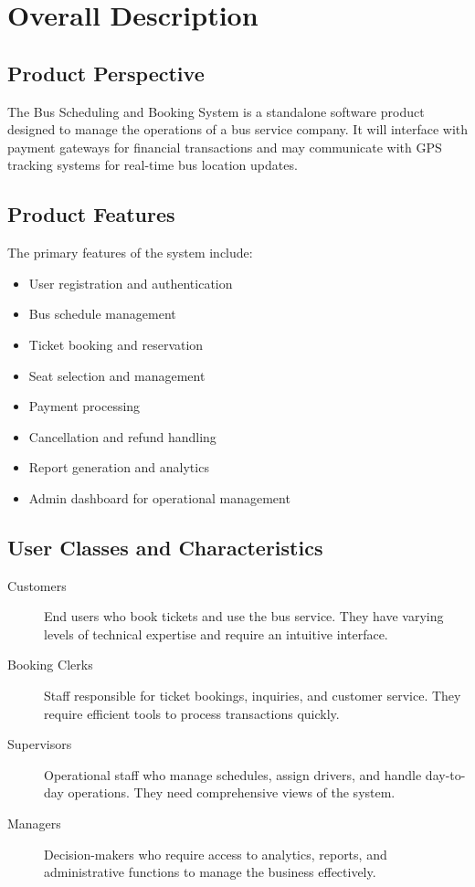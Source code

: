 \documentclass[12pt,a4paper]{report}
\begin{document}
\chapter{Overall Description}

\section{Product Perspective}
The Bus Scheduling and Booking System is a standalone software product designed to manage the operations of a bus service company. It will interface with payment gateways for financial transactions and may communicate with GPS tracking systems for real-time bus location updates.

\section{Product Features}
The primary features of the system include:
\begin{itemize}
    \item User registration and authentication
    \item Bus schedule management
    \item Ticket booking and reservation
    \item Seat selection and management
    \item Payment processing
    \item Cancellation and refund handling
    \item Report generation and analytics
    \item Admin dashboard for operational management
\end{itemize}

\section{User Classes and Characteristics}
\begin{description}
    \item[Customers] End users who book tickets and use the bus service. They have varying levels of technical expertise and require an intuitive interface.
    \item[Booking Clerks] Staff responsible for ticket bookings, inquiries, and customer service. They require efficient tools to process transactions quickly.
    \item[Supervisors] Operational staff who manage schedules, assign drivers, and handle day-to-day operations. They need comprehensive views of the system.
    \item[Managers] Decision-makers who require access to analytics, reports, and administrative functions to manage the business effectively.
\end{description}
\end{document}
